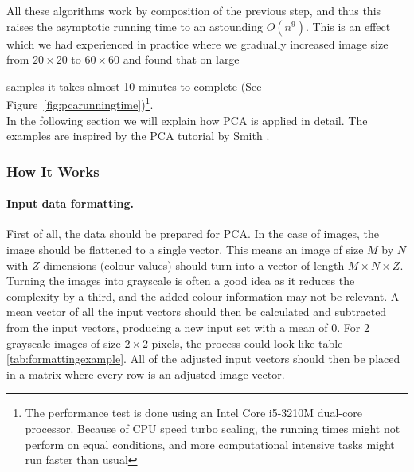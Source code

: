 \begin{minipage}{\linewidth}
\centering
{}
\label{fig:pcarunningtime}
\end{minipage}

All these algorithms work by composition of the previous step, and thus this raises the asymptotic running time to an astounding $\mathit{O}(n^9)$.
This is an effect which we had experienced in practice where we gradually increased image size from $20 \times 20$ to $60 \times 60$ and found that on large

samples it takes almost 10 minutes to complete (See Figure~\ref{fig:pcarunningtime})\footnote{The performance test is done using an Intel Core i5-3210M dual-core processor. Because of CPU speed turbo scaling, the running times might not perform on equal conditions, and more computational intensive tasks might run faster than usual}.\\


In the following section we will explain how PCA is applied in detail. The examples are inspired by the PCA tutorial by Smith \cite{smith2002tutorial}.

\subsubsection{How It Works}
\label{ssub:HowItWorks}
\paragraph{Input data formatting.}
First of all, the data should be prepared for PCA.
In the case of images, the image should be flattened to a single vector.
This means an image of size $M$ by $N$ with $Z$ dimensions (colour values) should turn into a vector of length $M\times N\times Z$.
Turning the images into grayscale is often a good idea as it reduces the complexity by a third, and the added colour information may not be relevant.
A mean vector of all the input vectors should then be calculated and subtracted from the input vectors, producing a new input set with a mean of 0.
For 2 grayscale images of size $2\times 2$ pixels, the process could look like table \ref{tab:formattingexample}.
All of the adjusted input vectors should then be placed in a matrix where every row is an adjusted image vector.

